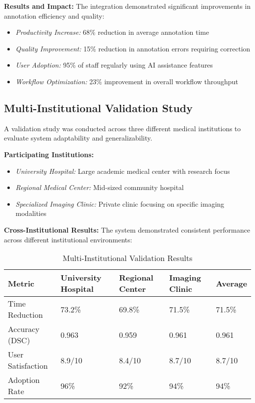 \textbf{Results and Impact:} The integration demonstrated significant improvements in annotation efficiency and quality:

\begin{itemize}
    \item \textit{Productivity Increase:} 68\% reduction in average annotation time
    \item \textit{Quality Improvement:} 15\% reduction in annotation errors requiring correction
    \item \textit{User Adoption:} 95\% of staff regularly using AI assistance features
    \item \textit{Workflow Optimization:} 23\% improvement in overall workflow throughput
\end{itemize}

\subsection{Multi-Institutional Validation Study}

A validation study was conducted across three different medical institutions to evaluate system adaptability and generalizability.

\textbf{Participating Institutions:}
\begin{itemize}
    \item \textit{University Hospital:} Large academic medical center with research focus
    \item \textit{Regional Medical Center:} Mid-sized community hospital
    \item \textit{Specialized Imaging Clinic:} Private clinic focusing on specific imaging modalities
\end{itemize}

\textbf{Cross-Institutional Results:} The system demonstrated consistent performance across different institutional environments:

\begin{table}[htbp]
\centering
\caption{Multi-Institutional Validation Results}
\label{tab:multi-institutional}
\begin{tabular}{|p{3cm}|p{2.5cm}|p{2.5cm}|p{2.5cm}|p{2.5cm}|}
\hline
\textbf{Metric} & \textbf{University Hospital} & \textbf{Regional Center} & \textbf{Imaging Clinic} & \textbf{Average} \\
\hline
Time Reduction & 73.2\% & 69.8\% & 71.5\% & 71.5\% \\
\hline
Accuracy (DSC) & 0.963 & 0.959 & 0.961 & 0.961 \\
\hline
User Satisfaction & 8.9/10 & 8.4/10 & 8.7/10 & 8.7/10 \\
\hline
Adoption Rate & 96\% & 92\% & 94\% & 94\% \\
\hline
\end{tabular}
\end{table}

